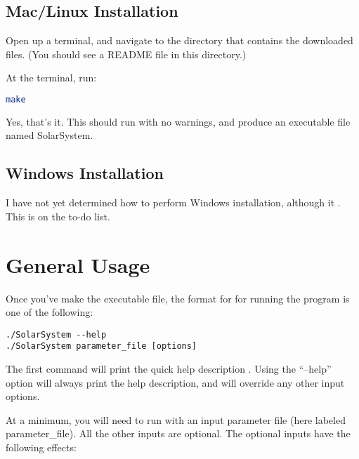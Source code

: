 \documentclass{article}
\begin{document}
\subsection{Mac/Linux Installation}

Open up a terminal, and navigate to the directory that contains the downloaded files.  (You should see a README file in this directory.)

At the terminal, run:

\begin{lstlisting}[language=bash]
make
\end{lstlisting}

Yes, that's it.  This should run with no warnings, and produce an executable file named SolarSystem.

\subsection{Windows Installation}

I have not yet determined how to perform Windows installation, although it .  This is on the to-do list.

\section{General Usage}

Once you've make the executable file, the format for for running the program is one of the following:

\begin{lstlisting}
./SolarSystem --help
./SolarSystem parameter_file [options]
\end{lstlisting}

The first command will print the quick help description .  Using the ``--help'' option will always print the help description, and will override any other input options.

At a minimum, you will need to run with an input parameter file (here labeled parameter\_file).  All the other inputs are optional.  The optional inputs have the following effects:
\end{document}
